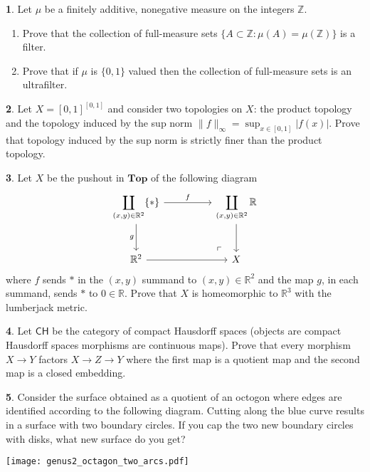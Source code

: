 \documentclass[11pt]{article}
\theoremstyle{definition}
\newtheorem{problem}{}
\newcommand{\bp}{\begin{problem}}
\newcommand{\ep}{\end{problem}\bigskip}
\theoremstyle{theorem}
\newcommand{\R}{\mathbb{R}}
\begin{document}
\pagestyle{fancy}
\fancyfoot[R,C,L]{}

\newcommand{\Top}{\mathbf{Top}}
\newcommand{\Set}{\mathbf{Set}}
\newcommand{\N}{\mathbb{N}}

\bp Let $\mu$ be a finitely additive, nonegative measure on the integers $\mathbb{Z}$. 
\begin{enumerate}[label=(\alph*)]
  \item  Prove that the collection of full-measure sets $\{A\subset \mathbb{Z}:\mu(A)=\mu(\mathbb{Z})\}$ is a filter.
\item Prove that if $\mu$ is $\{0,1\}$ valued then the collection of full-measure sets is an ultrafilter.
\end{enumerate}
\ep

\bp Let $X=[0,1]^{[0,1]}$ and consider two topologies on $X$:  the product topology and the topology induced by the sup norm $\|f\|_\infty = \sup_{x\in [0,1]}|f(x)|.$  Prove that topology induced by the sup norm is strictly finer than the product topology.  
\ep

\bp Let $X$ be the  pushout in $\Top$ of the following diagram
\[
\begin{tikzcd}[row sep=large, column sep=huge]
\displaystyle \coprod_{(x,y)\in\R^2} \{\ast \}
  \arrow[r,  "f"] \arrow[d, "g"'] 
& \displaystyle \coprod_{(x,y)\in\R^2} \R
  \arrow[d] \\
\mathbb{R}^2 \arrow[r] 
& X \arrow[ul, phantom, "\ulcorner", very near start] %
\end{tikzcd}
\]
where $f$ sends $\ast$ in the $(x,y)$ summand to $(x,y)\in \R^2$ and the map $g$, in each summand, sends $\ast$ to $0\in \R$.  Prove that $X$ is homeomorphic to $\R^3$ with the lumberjack metric.
\ep

\bp Let $\mathsf{CH}$ be the category of compact Hausdorff spaces (objects are compact Hausdorff spaces morphisms are continuous maps).  Prove that every morphism $X\to Y$ factors $X\to Z\to Y$ where the first map is a quotient map and the second map is a closed embedding.
\ep

\bp Consider the surface obtained as a quotient of an octogon where edges are identified according to the following diagram.  Cutting along the blue curve results in a surface with two boundary circles.  If you cap the two new boundary circles with disks, what new surface do you get?

\begin{center}
\texttt{[image: genus2\_octagon\_two\_arcs.pdf]}
\end{center}
\ep
\end{document}
